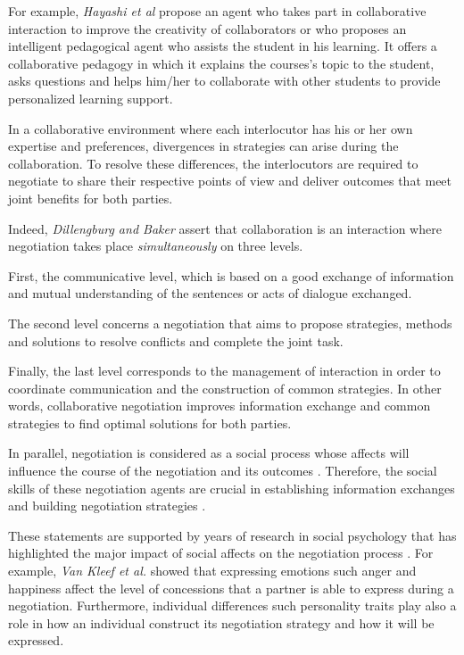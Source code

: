 \documentclass[10pt, a4paper]{article} %
\begin{document}
For example, \emph{Hayashi et al} propose an agent who takes part in collaborative interaction to improve the creativity of collaborators \cite{hayashi2013embodied} or \cite{soliman2010intelligent} who proposes an intelligent pedagogical agent who assists the student in his learning. It offers a collaborative pedagogy in which it explains the courses's topic to the student, asks questions and helps him/her to collaborate with other students to provide personalized learning support.

In a collaborative environment where each interlocutor has his or her own expertise and preferences, divergences in strategies can arise during the collaboration. 
To resolve these differences, the interlocutors are required to negotiate to share their respective points of view and deliver outcomes that meet joint benefits for both parties.  

Indeed, \emph{Dillengburg and Baker} \cite{dillenbourg1996negotiation} assert that collaboration is an interaction where negotiation takes place \textit{simultaneously} on three levels. 

First, the communicative level, which is based on a good exchange of information and mutual understanding of the sentences or acts of dialogue exchanged. 

The second level concerns a negotiation that aims to propose strategies, methods and solutions to resolve conflicts and complete the joint task. 

Finally, the last level corresponds to the management of interaction in order to coordinate communication and the construction of common strategies. In other words, collaborative negotiation improves information exchange and common strategies to find optimal solutions for both parties. 

In parallel, negotiation is considered as a social process whose affects will influence the course of the negotiation and its outcomes \cite{broekens2010affective}. Therefore, the social skills of these negotiation agents are crucial in establishing information exchanges and building negotiation strategies \cite{jin2010study}. 

These statements are supported by years of research in social psychology that has highlighted the major impact of social affects on the negotiation process \cite{thompson2010negotiation}. For example, \emph{Van Kleef et al.} \cite{van2006power} showed that expressing emotions such anger and happiness affect the level of concessions that a partner is able to express during a negotiation. Furthermore, individual differences such personality traits \cite{sharma2013role} play also a role in how an individual construct its negotiation strategy and how it will be expressed. 
\end{document}
